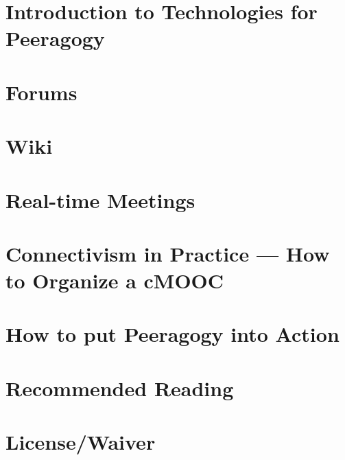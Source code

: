 \documentclass[nols,nobib]{tufte-book}
\begin{document}

%
\chapter[\textbf{Peeragogy Technology}]{Introduction to Technologies for Peeragogy}

%
\chapter[\textbf{Forums}]{ Forums } 
%

%
\chapter[\textbf{Wiki}]{ Wiki } 
%

%
\chapter[\textbf{Real-time Meetings}]{ Real-time Meetings } 
%

%
\chapter[\textbf{How to Organize a MOOC}]{ Connectivism in Practice ---  How to Organize a cMOOC}
%



\chapter[\textbf{How to put Peeragogy into Action}]{How to put Peeragogy into Action}
%


\chapter[\textbf{Recommended Reading}]{Recommended Reading}
%


\newpage
\chapter[\textbf{License/Waiver}]{License/Waiver} \label{license-chapter}

%
\pagestyle{empty} \thispagestyle{empty}
\clearpage\mbox{}\clearpage\mbox{}\clearpage    %
\end{document}

